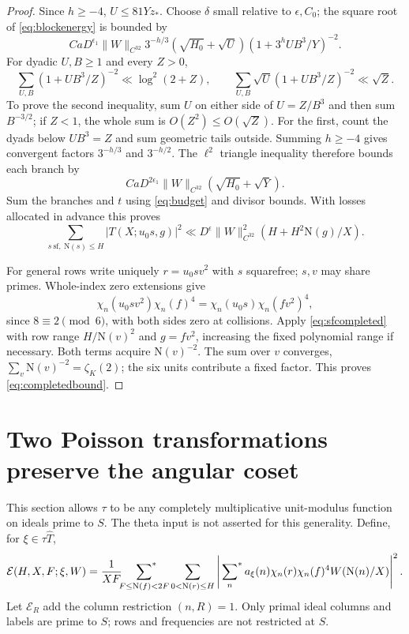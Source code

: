 \documentclass[11pt,a4paper]{article}
\numberwithin{equation}{section}
\theoremstyle{definition}
\theoremstyle{remark}
\newcommand{\N}{\mathrm N}
\newcommand{\E}{\mathcal E}
\newcommand{\sfstar}{\sideset{}{^*}\sum}
\begin{document}
\begin{proof}
Since $h\ge-4$, $U\le81Yz_*$. Choose $\delta$ small relative to $\epsilon,C_0$; the square root of \eqref{eq:blockenergy} is bounded by
\[
 C aD^{\epsilon_1}\|W\|_{C^{32}}3^{-h/3}(\sqrt{H_0}+\sqrt U)(1+3^hUB^3/Y)^{-2}.
\]
For dyadic $U,B\ge1$ and every $Z>0$,
\[
 \sum_{U,B}(1+UB^3/Z)^{-2}\ll\log^2(2+Z),\qquad
 \sum_{U,B}\sqrt U(1+UB^3/Z)^{-2}\ll\sqrt Z.
\]
To prove the second inequality, sum $U$ on either side of $U=Z/B^3$ and then sum $B^{-3/2}$; if $Z<1$, the whole sum is $O(Z^2)\le O(\sqrt Z)$. For the first, count the dyads below $UB^3=Z$ and sum geometric tails outside. Summing $h\ge-4$ gives convergent factors $3^{-h/3}$ and $3^{-h/2}$. The $\ell^2$ triangle inequality therefore bounds each branch by
\[
 C aD^{2\epsilon_1}\|W\|_{C^{32}}(\sqrt{H_0}+\sqrt Y).
\]
Sum the branches and $t$ using \eqref{eq:budget} and divisor bounds. With losses allocated in advance this proves
\begin{equation}\label{eq:sfcompleted}
 \sum_{s\ \mathrm{sf},\ \N(s)\le H}|T(X;u_0s,g)|^2
 \ll D^\epsilon\|W\|_{C^{32}}^2(H+H^2\N(g)/X).
\end{equation}

For general rows write uniquely $r=u_0sv^2$ with $s$ squarefree; $s,v$ may share primes. Whole-index zero extensions give
\[
 \chi_n(u_0sv^2)\chi_n(f)^4=\chi_n(u_0s)\chi_n(fv^2)^4,
\]
since $8\equiv2\pmod6$, with both sides zero at collisions. Apply \eqref{eq:sfcompleted} with row range $H/\N(v)^2$ and $g=fv^2$, increasing the fixed polynomial range if necessary. Both terms acquire $\N(v)^{-2}$. The sum over $v$ converges, $\sum_v\N(v)^{-2}=\zeta_K(2)$; the six units contribute a fixed factor. This proves \eqref{eq:completedbound}.
\end{proof}

\section{Two Poisson transformations preserve the angular coset}\label{sec:transfer}
This section allows $\tau$ to be any completely multiplicative unit-modulus function on ideals prime to $S$. The theta input is not asserted for this generality. Define, for $\xi\in\tau\widehat T$,
\begin{equation}\label{eq:energy}
 \E(H,X,F;\xi,W)=\frac1{XF}\sfstar_{F\le\N(f)<2F}
 \sum_{0<\N(r)\le H}\left|\sfstar_n a_\xi(n)\chi_n(r)\chi_n(f)^4W(\N(n)/X)\right|^2.
\end{equation}
Let $\E_R$ add the column restriction $(n,R)=1$. Only primal ideal columns and labels are prime to $S$; rows and frequencies are not restricted at $S$.
\end{document}

